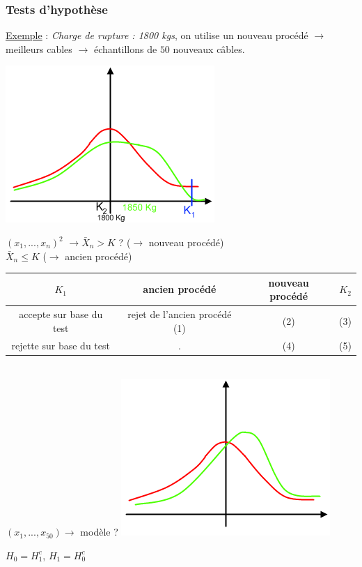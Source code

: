 \documentclass{article}
\begin{document}
\subsubsection{Tests d'hypothèse}

\underline{Exemple} : \textit{Charge de rupture : 1800 kgs}, on utilise un nouveau procédé $\rightarrow$ meilleurs cables 
$\rightarrow$ échantillons de $50$ nouveaux câbles.

\includegraphics{Figure2-11.png}

\noindent $(x_1,...,x_n)^2$ $\rightarrow \boxed{\bar{X}_n > K}$ ? ($\rightarrow$ nouveau procédé) \\
\noindent $\bar{X}_n \leq K$ ($\rightarrow$ ancien procédé)

\begin{tabular}{|*{4}{c|}}
\hline
$K_1$ & ancien procédé & nouveau procédé & $K_2$  \\
\hline
accepte sur base du test & rejet de l'ancien procédé (1) & (2) & (3)\\
\hline
rejette sur base du test & . & (4) & (5)\\
\hline
\end{tabular} \\

$(x_1,...,x_{50}) \rightarrow$ modèle ? \includegraphics{Figure2-12.png}

$H_0 = H_1^c$, $H_1 = H_0^c$ \\
\end{document}
